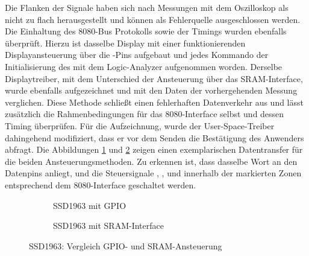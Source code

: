 Die Flanken der Signale haben sich nach Messungen mit dem Oszilloskop als nicht zu flach herausgestellt und können als Fehlerquelle ausgeschlossen werden. Die Einhaltung des 8080-Bus Protokolls sowie der Timings wurden ebenfalls überprüft. Hierzu ist dasselbe Display mit einer funktionierenden Displayansteuerung über die -Pins aufgebaut und jedes Kommando der Initialisierung des  mit dem Logic-Analyzer aufgenommen worden. Derselbe Displaytreiber, mit dem Unterschied der Ansteuerung über das SRAM-Interface, wurde ebenfalls aufgezeichnet und mit den Daten der vorhergehenden Messung verglichen. Diese Methode schließt einen fehlerhaften Datenverkehr aus und lässt zusätzlich die Rahmenbedingungen für das 8080-Interface selbst und dessen Timing überprüfen. Für die Aufzeichnung, wurde der User-Space-Treiber dahingehend modifiziert, dass er vor dem Senden die Bestätigung des Anwenders abfragt. Die Abbildungen \ref{fig:ssd1963_gpio} und \ref{fig:ssd1963_sram} zeigen einen exemplarischen Datentransfer für die beiden Ansteuerungsmethoden. Zu erkennen ist, dass dasselbe Wort an den Datenpins  anliegt, und die Steuersignale , ,  und  innerhalb der markierten Zonen entsprechend dem 8080-Interface geschaltet werden. 

\begin{figure}[htp]
        \begin{center}
        \begin{subfigure}[htp]{1\textwidth}
			\centering
	\caption{SSD1963 mit GPIO}
			\label{fig:ssd1963_gpio}
		\end{subfigure}


        \begin{subfigure}[htp]{1\textwidth}
	\centering
{}
	\caption{SSD1963 mit SRAM-Interface}
	\label{fig:ssd1963_sram}
\end{subfigure}

		\end{center}
\caption{SSD1963: Vergleich GPIO- und SRAM-Ansteuerung}
	\label{fig:ssd1963_gpio_sram}
\end{figure}

